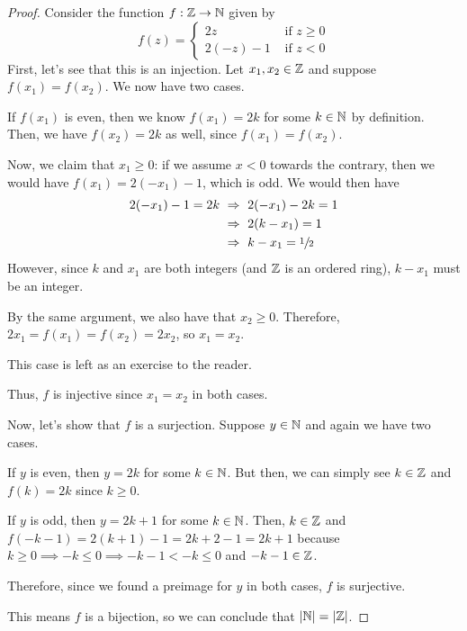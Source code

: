 \begin{proof}
    Consider the function $f: \mathbb{Z} \to \mathbb{N}$ given by
    \begin{equation*}
        f(z) =
        \begin{cases}
            2z        &\text{ if } z \geq 0\\
            2(-z) - 1 &\text{ if } z < 0
        \end{cases}
    \end{equation*}
    First, let's see that this is an injection.
    Let $x_1, x_2 \in \mathbb{Z}$ and suppose $f(x_1) = f(x_2)$.
    We now have two cases.

    \begin{case}[Case 1]
        If $f(x_1)$ is even, then we know $f(x_1) = 2k$ for some $k \in \mathbb{N}$ by definition.
        Then, we have $f(x_2) = 2k$ as well, since $f(x_1) = f(x_2)$.

        Now, we claim that $x_1 \geq 0$:
        if we assume $x < 0$ towards the contrary,
        then we would have $f(x_1) = 2(-x_1) - 1$, which is odd.
        We would then have
        \begin{align*}
            2(-x_1) - 1 = 2k &~\Rightarrow~ 2(-x_1) - 2k = 1\\
                             &~\Rightarrow~ 2(k - x_1) = 1\\
                             &~\Rightarrow~ k - x_1 = \sfrac{1}{2}
        \end{align*}
        However, since $k$ and $x_1$ are both integers (and $\mathbb{Z}$ is an ordered ring),
        $k - x_1$ must be an integer. \contradiction

        By the same argument, we also have that $x_2 \geq 0$.
        Therefore, $2x_1 = f(x_1) = f(x_2) = 2x_2$, so $x_1 = x_2$.
    \end{case}
    \begin{case}[Case 2]
        This case is left as an exercise to the reader.
    \end{case}
    Thus, $f$ is injective since $x_1 = x_2$ in both cases.

    Now, let's show that $f$ is a surjection.
    Suppose $y \in \mathbb{N}$ and again we have two cases.

    \begin{case}[Case 1]
        If $y$ is even, then $y = 2k$ for some $k \in \mathbb{N}$.
        But then, we can simply see $k \in \mathbb{Z}$ and $f(k) = 2k$ since $k \geq 0$.
    \end{case}
    \begin{case}[Case 2]
        If $y$ is odd, then $y = 2k + 1$ for some $k \in \mathbb{N}$.
        Then, $k \in \mathbb{Z}$ and $f(-k - 1) = 2(k + 1) - 1 = 2k + 2 - 1 = 2k + 1$
        because $k \geq 0 \implies -k \leq 0 \implies -k - 1 < -k \leq 0$ and $-k - 1 \in \mathbb{Z}$.
    \end{case}
    Therefore, since we found a preimage for $y$ in both cases, $f$ is surjective.

    This means $f$ is a bijection, so we can conclude that $\lvert\mathbb{N}\rvert = \lvert\mathbb{Z}\rvert$.
\end{proof}

